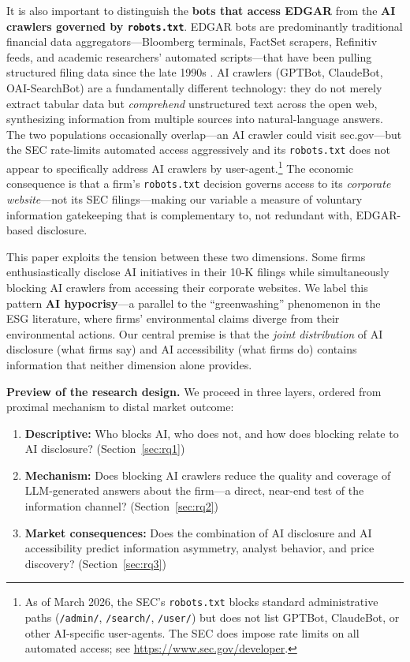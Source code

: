 \documentclass[12pt,a4paper]{article}
\begin{document}
It is also important to distinguish the \textbf{bots that access EDGAR} from the \textbf{AI crawlers governed by \texttt{robots.txt}}. EDGAR bots are predominantly traditional financial data aggregators---Bloomberg terminals, FactSet scrapers, Refinitiv feeds, and academic researchers' automated scripts---that have been pulling structured filing data since the late 1990s \citep[see][for analysis of EDGAR server traffic]{LoughranMcDonald2017}. AI crawlers (GPTBot, ClaudeBot, OAI-SearchBot) are a fundamentally different technology: they do not merely extract tabular data but \emph{comprehend} unstructured text across the open web, synthesizing information from multiple sources into natural-language answers. The two populations occasionally overlap---an AI crawler could visit sec.gov---but the SEC rate-limits automated access aggressively and its \texttt{robots.txt} does not appear to specifically address AI crawlers by user-agent.\footnote{As of March 2026, the SEC's \texttt{robots.txt} blocks standard administrative paths (\texttt{/admin/}, \texttt{/search/}, \texttt{/user/}) but does not list GPTBot, ClaudeBot, or other AI-specific user-agents. The SEC does impose rate limits on all automated access; see \url{https://www.sec.gov/developer}.} The economic consequence is that a firm's \texttt{robots.txt} decision governs access to its \emph{corporate website}---not its SEC filings---making our variable a measure of voluntary information gatekeeping that is complementary to, not redundant with, EDGAR-based disclosure.

This paper exploits the tension between these two dimensions. Some firms enthusiastically disclose AI initiatives in their 10-K filings while simultaneously blocking AI crawlers from accessing their corporate websites. We label this pattern \textbf{AI hypocrisy}---a parallel to the ``greenwashing'' phenomenon in the ESG literature, where firms' environmental claims diverge from their environmental actions. Our central premise is that the \emph{joint distribution} of AI disclosure (what firms say) and AI accessibility (what firms do) contains information that neither dimension alone provides.

\medskip
\noindent\textbf{Preview of the research design.} We proceed in three layers, ordered from proximal mechanism to distal market outcome:
\begin{enumerate}[label=(\roman*)]
    \item \textbf{Descriptive:} Who blocks AI, who does not, and how does blocking relate to AI disclosure? (Section~\ref{sec:rq1})
    \item \textbf{Mechanism:} Does blocking AI crawlers reduce the quality and coverage of LLM-generated answers about the firm---a direct, near-end test of the information channel? (Section~\ref{sec:rq2})
    \item \textbf{Market consequences:} Does the combination of AI disclosure and AI accessibility predict information asymmetry, analyst behavior, and price discovery? (Section~\ref{sec:rq3})
\end{enumerate}
\end{document}
